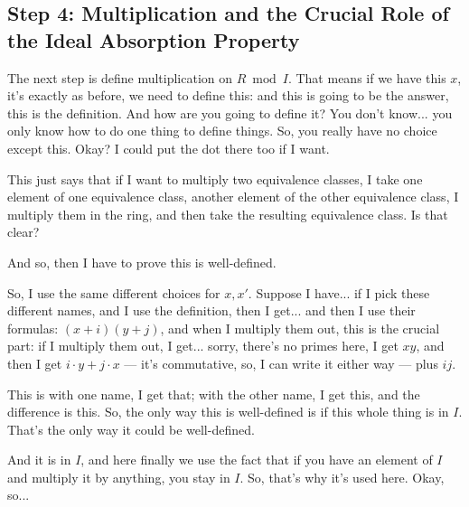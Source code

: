 \subsection{Step 4: Multiplication and the Crucial Role of the Ideal Absorption Property}

\begin{speech}[00:43:13 - 00:45:11]
The next step is define multiplication on $R \bmod I$.  That means if we have this $x$, it's exactly as before, we need to define this:  and this is going to be the answer, this is the definition. And how are you going to define it? You don't know... you only know how to do one thing to define things. So, you really have no choice except this. Okay? I could put the dot there too if I want. 

This just says that if I want to multiply two equivalence classes, I take one element of one equivalence class, another element of the other equivalence class, I multiply them in the ring, and then take the resulting equivalence class. Is that clear? 

And so, then I have to prove this is well-defined. 

So, I use the same different choices for $x, x'$. Suppose I have... if I pick these different names,  and I use the definition, then I get... and then I use their formulas: $(x + i)(y + j)$,  and when I multiply them out, this is the crucial part: if I multiply them out, I get... sorry, there's no primes here, I get $x y$, and then I get $i \cdot y + j \cdot x$ --- it's commutative, so, I can write it either way --- plus $i j$.  

This is with one name, I get that; with the other name, I get this, and the difference is this. So, the only way this is well-defined is if this whole thing is in $I$.  That's the only way it could be well-defined. 

And it is in $I$, and here finally we use the fact that if you have an element of $I$ and multiply it by anything, you stay in $I$. So, that's why it's used here. Okay, so...
\end{speech}

